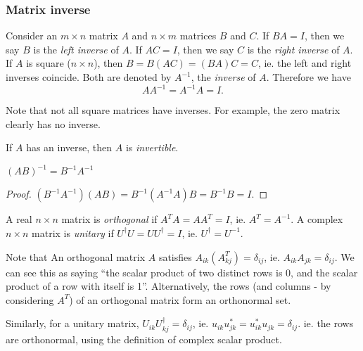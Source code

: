 \documentclass[a4paper]{article}
\begin{document}
\subsubsection{Matrix inverse}

\begin{defi}
  Consider an $m\times n$ matrix $A$ and $n\times m$ matrices $B$ and $C$. If $BA = I$, then we say $B$ is the \emph{left inverse} of $A$. If $AC = I$, then we say $C$ is the \emph{right inverse} of $A$. If $A$ is square ($n\times n$), then $B = B(AC) = (BA)C = C$, ie. the left and right inverses coincide. Both are denoted by $A^{-1}$, the \emph{inverse} of $A$. Therefore we have
  \[
    AA^{-1} = A^{-1}A = I.
  \]
\end{defi}
Note that not all square matrices have inverses. For example, the zero matrix clearly has no inverse.

\begin{defi}
  If $A$ has an inverse, then $A$ is \emph{invertible}.
\end{defi}

\begin{prop}
  $(AB)^{-1} = B^{-1}A^{-1}$
\end{prop}

\begin{proof}
  $(B^{-1}A^{-1})(AB) = B^{-1}(A^{-1}A)B = B^{-1}B = I$.
\end{proof}

\begin{defi}
  A real $n\times n$ matrix is \emph{orthogonal} if $A^TA = AA^T = I$, ie. $A^T = A^{-1}$. A complex $n\times n$ matrix is \emph{unitary} if $U^\dagger U = UU^\dagger = I$, ie. $U^\dagger = U^{-1}$.
\end{defi}
Note that An orthogonal matrix $A$ satisfies $A_{ik}(A^T_{kj}) = \delta_{ij}$, ie. $A_{ik}A_{jk} = \delta_{ij}$. We can see this as saying ``the scalar product of two distinct rows is 0, and the scalar product of a row with itself is 1''. Alternatively, the rows (and columns - by considering $A^T$) of an orthogonal matrix form an orthonormal set.

Similarly, for a unitary matrix, $U_{ik}U_{kj}^\dagger = \delta_{ij}$, ie. $u_{ik}u_{jk}^* = u_{ik}^*u_{jk} =\delta_{ij}$. ie. the rows are orthonormal, using the definition of complex scalar product.
\end{document}
